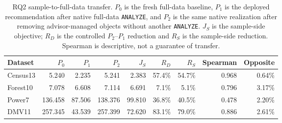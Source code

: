 \begin{table}[t]
\centering
\scriptsize
\caption{RQ2 sample-to-full-data transfer. $P_0$ is the fresh full-data
baseline, $P_1$ is the deployed recommendation after native full-data
\texttt{ANALYZE}, and $P_2$ is the same native realization after removing
advisor-managed objects without another \texttt{ANALYZE}. $J_S$ is the
sample-side objective; $R_D$ is the controlled $P_2$--$P_1$ reduction and
$R_S$ is the sample-side reduction. Spearman is descriptive, not a guarantee
of transfer.}
\label{tab:rq2-sample-full-transfer}
\begin{tabular}{lrrrrrrrr}
\toprule
Dataset & $P_0$ & $P_1$ & $P_2$ & $J_S$ & $R_D$ & $R_S$ & Spearman & Opposite \\
\midrule
Census13 & 5.240 & 2.235 & 5.241 & 2.383 & 57.4\% & 54.7\% & 0.968 & 0.64\% \\
Forest10 & 7.078 & 6.608 & 7.114 & 6.691 & 7.1\% & 5.1\% & 0.796 & 3.17\% \\
Power7 & 136.458 & 87.506 & 138.376 & 99.810 & 36.8\% & 40.5\% & 0.478 & 2.20\% \\
DMV11 & 257.345 & 43.539 & 257.399 & 72.620 & 83.1\% & 79.0\% & 0.886 & 2.61\% \\
\bottomrule
\end{tabular}
\end{table}
